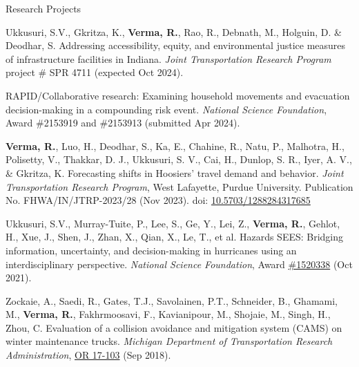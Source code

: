 \documentclass{CV} %
\begin{document}
\begin{rSection}{Research Projects}
    \begin{etaremune}
        \item Ukkusuri, S.V., Gkritza, K., \textbf{Verma, R.}, Rao, R., Debnath, M., Holguin, D. \& Deodhar, S. Addressing accessibility, equity, and environmental justice measures of infrastructure facilities in Indiana. \textit{Joint Transportation Research Program} project \# SPR 4711 (expected Oct 2024).
        
        \item RAPID/Collaborative research: Examining household movements and evacuation decision-making in a compounding risk event. \textit{National Science Foundation}, Award \#2153919 and \#2153913 (submitted Apr 2024).

        \item \textbf{Verma, R.}, Luo, H., Deodhar, S., Ka, E., Chahine, R., Natu, P., Malhotra, H., Polisetty, V., Thakkar, D. J., Ukkusuri, S. V., Cai, H., Dunlop, S. R., Iyer, A. V., \& Gkritza, K. Forecasting shifts in Hoosiers' travel demand and behavior. \textit{Joint Transportation Research Program}, West Lafayette, Purdue University. Publication No. FHWA/IN/JTRP-2023/28 (Nov 2023). doi: \href{https://doi.org/10.5703/1288284317685}{10.5703/1288284317685}

        \item Ukkusuri, S.V., Murray-Tuite, P., Lee, S., Ge, Y., Lei, Z., \textbf{Verma, R.}, Gehlot, H., Xue, J., Shen, J., Zhan, X., Qian, X., Le, T., et al. Hazards SEES: Bridging information, uncertainty, and decision-making in hurricanes using an interdisciplinary perspective. \textit{National Science Foundation}, Award \href{https://www.nsf.gov/awardsearch/showAward?AWD_ID=1520338}{\#1520338} (Oct 2021).
        
        \item Zockaie, A., Saedi, R., Gates, T.J., Savolainen, P.T., Schneider, B., Ghamami, M., \textbf{Verma, R.}, Fakhrmoosavi, F., Kavianipour, M., Shojaie, M., Singh, H., Zhou, C. Evaluation of a collision avoidance and mitigation system (CAMS) on winter maintenance trucks. \textit{Michigan Department of Transportation Research Administration}, \href{https://rosap.ntl.bts.gov/view/dot/42752}{OR 17-103} (Sep 2018).
    \end{etaremune}

\end{rSection}
\end{document}
